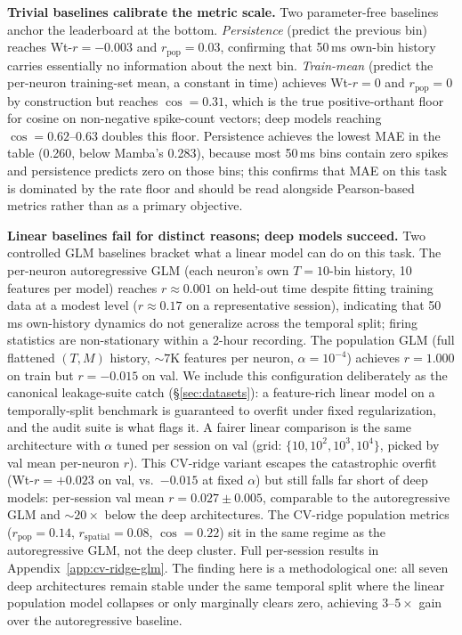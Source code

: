 \documentclass{article}
\begin{document}
\textbf{Trivial baselines calibrate the metric scale.}  Two
parameter-free baselines anchor the leaderboard at the bottom.
\emph{Persistence} (predict the previous bin) reaches Wt-$r{=}{-}0.003$
and $r_\mathrm{pop}{=}0.03$, confirming that 50\,ms own-bin history
carries essentially no information about the next bin.
\emph{Train-mean} (predict the per-neuron training-set mean, a constant
in time) achieves Wt-$r{=}0$ and $r_\mathrm{pop}{=}0$ by construction
but reaches $\cos{=}0.31$, which is the true positive-orthant floor for
cosine on non-negative spike-count vectors; deep models reaching
$\cos{=}0.62\text{--}0.63$ doubles this floor.  Persistence achieves
the lowest MAE in the table (0.260, below Mamba's 0.283), because most
50\,ms bins contain zero spikes and persistence predicts zero on those
bins; this confirms that MAE on this task is dominated by the rate
floor and should be read alongside Pearson-based metrics rather than
as a primary objective.

\textbf{Linear baselines fail for distinct reasons; deep models
succeed.}  Two controlled GLM baselines bracket what a linear model
can do on this task.  The per-neuron autoregressive GLM (each neuron's
own $T{=}10$-bin history, 10 features per model) reaches
$r \approx 0.001$ on held-out time despite fitting training data at a
modest level ($r \approx 0.17$ on a representative session), indicating
that 50\,ms own-history dynamics do not generalize across the temporal
split; firing statistics are non-stationary within a 2-hour recording.
The population GLM (full flattened $(T, M)$ history, ${\sim}7\text{K}$
features per neuron, $\alpha{=}10^{-4}$) achieves $r = 1.000$ on train
but $r = -0.015$ on val.  We include this configuration deliberately as
the canonical leakage-suite catch (\S\ref{sec:datasets}): a feature-rich
linear model on a temporally-split benchmark is guaranteed to overfit
under fixed regularization, and the audit suite is what flags it.  A
fairer linear comparison is the same architecture with $\alpha$ tuned
per session on val (grid: $\{10, 10^{2}, 10^{3}, 10^{4}\}$, picked by
val mean per-neuron $r$).  This CV-ridge variant escapes the
catastrophic overfit (Wt-$r{=}{+}0.023$ on val, vs.\ $-0.015$ at fixed
$\alpha$) but still falls far short of deep models: per-session val
mean $r{=}0.027 \pm 0.005$, comparable to the autoregressive GLM and
${\sim}20\times$ below the deep architectures.  The CV-ridge population
metrics ($r_\mathrm{pop}{=}0.14$, $r_\mathrm{spatial}{=}0.08$,
$\cos{=}0.22$) sit in the same regime as the autoregressive GLM, not
the deep cluster.  Full per-session results in
Appendix~\ref{app:cv-ridge-glm}.  The finding here is a methodological
one: all seven deep architectures remain stable under the same
temporal split where the linear population model collapses or only
marginally clears zero, achieving $3\text{--}5\times$ gain over the
autoregressive baseline.
\end{document}
